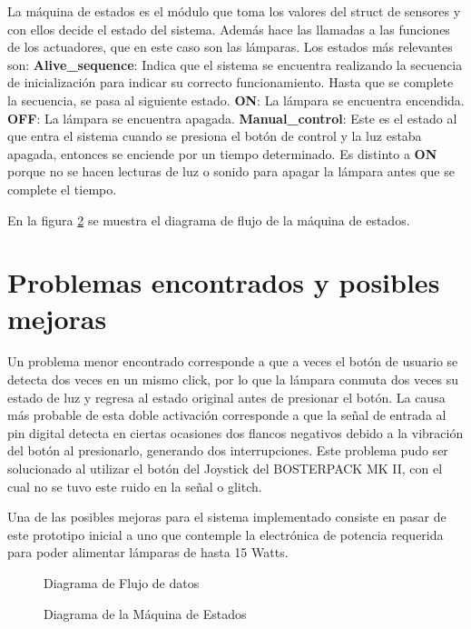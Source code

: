 La máquina de estados es el módulo que toma los valores del struct de sensores y con ellos decide el
estado del sistema. Además hace las llamadas a las funciones de los actuadores, que en este caso son
las lámparas. 
Los estados más relevantes son:
 \textbf{Alive\_sequence}: Indica que el sistema se encuentra realizando la secuencia de
  inicialización para indicar su correcto funcionamiento. Hasta que se complete la secuencia, se
  pasa al siguiente estado. 
 \textbf{ON}: La lámpara se encuentra encendida.
 \textbf{OFF}: La lámpara se encuentra apagada.
 \textbf{Manual\_control}: Este es el estado al que entra el sistema cuando se presiona el
  botón de control y la luz estaba apagada, entonces se enciende por un tiempo determinado. Es
  distinto a \textbf{ON} porque no se hacen lecturas de luz o sonido para apagar la lámpara antes
  que se complete el tiempo.

En la figura \ref{fig:state_machine} se muestra el diagrama de flujo de la máquina de estados. 

\section{Problemas encontrados y posibles mejoras}

Un problema menor encontrado corresponde a que a veces el botón de usuario se detecta
dos veces en un mismo click, por lo que la lámpara conmuta dos veces su estado de luz y regresa al
estado original antes de presionar el botón. La causa más probable de esta doble
activación corresponde a que la señal de entrada al pin digital detecta en ciertas ocasiones dos
flancos negativos debido a la vibración del botón al presionarlo, generando dos interrupciones. Este
problema pudo ser solucionado al utilizar el botón del Joystick del BOSTERPACK MK II, con el cual no
se tuvo este ruido en la señal o glitch.

Una de las posibles mejoras para el sistema implementado consiste en pasar de este prototipo inicial
a uno que contemple la electrónica de potencia requerida para poder alimentar lámparas de hasta 15
Watts.

\begin{figure}
  \centering
\scalebox{.75}{}
\caption{Diagrama de Flujo de datos}
\label{fig:data_flow}
\end{figure}



\begin{figure}
\centering
\hspace*{-1cm}
\scalebox{.5}{}
\caption{Diagrama de la Máquina de Estados}
\label{fig:state_machine}
\end{figure}

